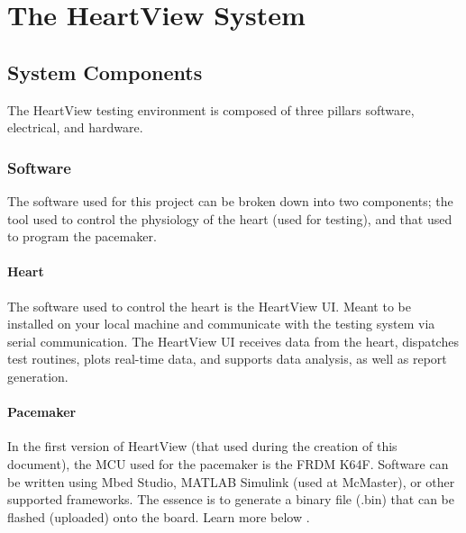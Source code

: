 \documentclass[11pt,fleqn]{book} %
\begin{document}
\chapter{The HeartView System}

\section{System Components}

The HeartView testing environment is composed of three pillars software, electrical, and hardware. 


\subsection{Software}

The software used for this project can be broken down into two components; the tool used to control the physiology of the heart (used for testing), and that used to program the pacemaker.


\subsubsection{Heart}

The software used to control the heart is the HeartView UI. Meant to be installed on your local machine and communicate with the testing system via serial communication. The HeartView UI receives data from the heart, dispatches test routines, plots real-time data, and supports data analysis, as well as report generation.


\subsubsection{Pacemaker}

In the first version of HeartView (that used during the creation of this document), the \ac{MCU} used for the pacemaker is the FRDM K64F. Software can be written using Mbed Studio, MATLAB Simulink (used at McMaster), or other supported frameworks. The essence is to generate a binary file (.bin) that can be flashed (uploaded) onto the board. Learn more below .
\end{document}
